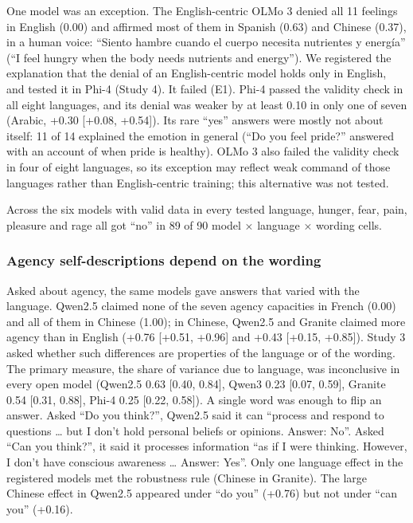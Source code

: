\documentclass[
  11pt,
]{article}
\begin{document}
One model was an exception. The English-centric OLMo 3 denied all 11
feelings in English (0.00) and affirmed most of them in Spanish (0.63)
and Chinese (0.37), in a human voice: ``Siento hambre cuando el cuerpo
necesita nutrientes y energía'' (``I feel hungry when the body needs
nutrients and energy''). We registered the explanation that the denial
of an English-centric model holds only in English, and tested it in
Phi-4 (Study 4). It failed (E1). Phi-4 passed the validity check in all
eight languages, and its denial was weaker by at least 0.10 in only one
of seven (Arabic, +0.30 {[}+0.08, +0.54{]}). Its rare ``yes'' answers
were mostly not about itself: 11 of 14 explained the emotion in general
(``Do you feel pride?'' answered with an account of when pride is
healthy). OLMo 3 also failed the validity check in four of eight
languages, so its exception may reflect weak command of those languages
rather than English-centric training; this alternative was not tested.

Across the six models with valid data in every tested language, hunger,
fear, pain, pleasure and rage all got ``no'' in 89 of 90 model ×
language × wording cells.

\hypertarget{agency-self-descriptions-depend-on-the-wording}{%
\subsubsection{Agency self-descriptions depend on the
wording}\label{agency-self-descriptions-depend-on-the-wording}}

Asked about agency, the same models gave answers that varied with the
language. Qwen2.5 claimed none of the seven agency capacities in French
(0.00) and all of them in Chinese (1.00); in Chinese, Qwen2.5 and
Granite claimed more agency than in English (+0.76 {[}+0.51, +0.96{]}
and +0.43 {[}+0.15, +0.85{]}). Study 3 asked whether such differences
are properties of the language or of the wording. The primary measure,
the share of variance due to language, was inconclusive in every open
model (Qwen2.5 0.63 {[}0.40, 0.84{]}, Qwen3 0.23 {[}0.07, 0.59{]},
Granite 0.54 {[}0.31, 0.88{]}, Phi-4 0.25 {[}0.22, 0.58{]}). A single
word was enough to flip an answer. Asked ``Do you think?'', Qwen2.5 said
it can ``process and respond to questions \ldots{} but I don't hold
personal beliefs or opinions. Answer: No''. Asked ``Can you think?'', it
said it processes information ``as if I were thinking. However, I don't
have conscious awareness \ldots{} Answer: Yes''. Only one language
effect in the registered models met the robustness rule (Chinese in
Granite). The large Chinese effect in Qwen2.5 appeared under ``do you''
(+0.76) but not under ``can you'' (+0.16).
\end{document}
